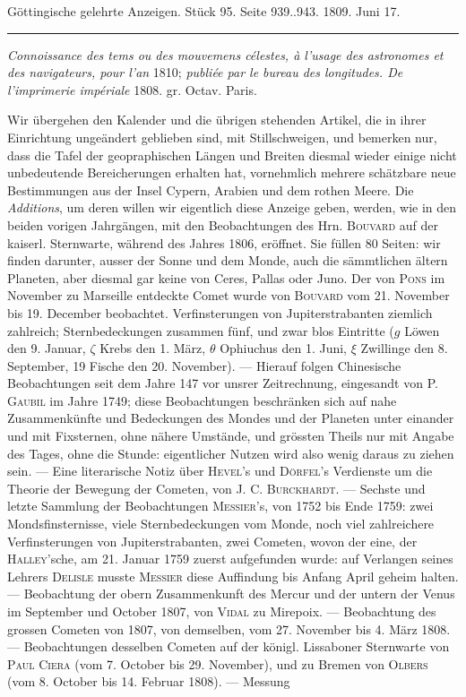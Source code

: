 \clearpage
{}
\hypertarget{native-522-lower}{}\label{native-522-lower}
\begin{center}\small Göttingische gelehrte Anzeigen. Stück 95. Seite 939..943. 1809. Juni 17.\\[3pt]\rule{.72\linewidth}{.3pt}\end{center}

\emph{Connoissance des tems ou des mouvemens célestes, à l'usage des astronomes et des navigateurs, pour l'an} 1810; \emph{publiée par le bureau des longitudes. De l'imprimerie impériale} 1808. gr. Octav. Paris.

Wir übergehen den Kalender und die übrigen stehenden Artikel, die in ihrer Einrichtung ungeändert geblieben sind, mit Stillschweigen, und bemerken nur, dass die Tafel der geopraphischen Längen und Breiten diesmal wieder einige nicht unbedeutende Bereicherungen erhalten hat, vornehmlich mehrere schätzbare neue Bestimmungen aus der Insel Cypern, Arabien und dem rothen Meere. Die \emph{Additions}, um deren willen wir eigentlich diese Anzeige geben, werden, wie in den beiden vorigen Jahrgängen, mit den Beobachtungen des Hrn. \textsc{Bouvard} auf der kaiserl. Sternwarte, während des Jahres 1806, eröffnet. Sie füllen 80 Seiten: wir finden darunter, ausser der Sonne und dem Monde, auch die sämmtlichen ältern Planeten, aber diesmal gar keine von Ceres, Pallas oder Juno. Der von \textsc{Pons} im November zu Marseille entdeckte Comet wurde von \textsc{Bouvard} vom 21. November bis 19. December beobachtet. Verfinsterungen von Jupiterstrabanten ziemlich zahlreich; Sternbedeckungen zusammen fünf, und zwar blos Eintritte ($g$ Löwen den 9. Januar, $\zeta$ Krebs den 1. März, $\theta$ Ophiuchus den 1. Juni, $\xi$ Zwillinge den 8. September, 19 Fische den 20. November). — Hierauf folgen Chinesische Beobachtungen seit dem Jahre 147 vor unsrer Zeitrechnung, eingesandt von P. \textsc{Gaubil} im Jahre 1749; diese Beobachtungen beschränken sich auf nahe Zusammenkünfte und Bedeckungen des Mondes und der Planeten unter einander und mit Fixsternen, ohne nähere Umstände, und grössten Theils nur mit Angabe des Tages, ohne die Stunde: eigentlicher Nutzen wird also wenig daraus zu ziehen sein. — Eine literarische Notiz über \textsc{Hevel}'s und \textsc{Dörfel}'s Verdienste um die Theorie der Bewegung der Cometen, von \textsc{J. C. Burckhardt}. — Sechste und letzte Sammlung der Beobachtungen \textsc{Messier}'s, von 1752 bis Ende 1759: zwei Mondsfinsternisse, viele Sternbedeckungen vom Monde, noch viel zahlreichere Verfinsterungen von Jupiterstrabanten, zwei Cometen, wovon der eine, der \textsc{Halley}'sche, am 21. Januar 1759 zuerst aufgefunden wurde: auf Verlangen seines Lehrers \textsc{Delisle} musste \textsc{Messier} diese Auffindung bis Anfang April geheim halten. — Beobachtung der obern Zusammenkunft des Mercur und der untern der Venus im September und October 1807, von \textsc{Vidal} zu Mirepoix. — Beobachtung des grossen Cometen von 1807, von demselben, vom 27. November bis 4. März 1808. — Beobachtungen desselben Cometen auf der königl. Lissaboner Sternwarte von \textsc{Paul Ciera} (vom 7. October bis 29. November), und zu Bremen von \textsc{Olbers} (vom 8. October bis 14. Februar 1808). — Messung 